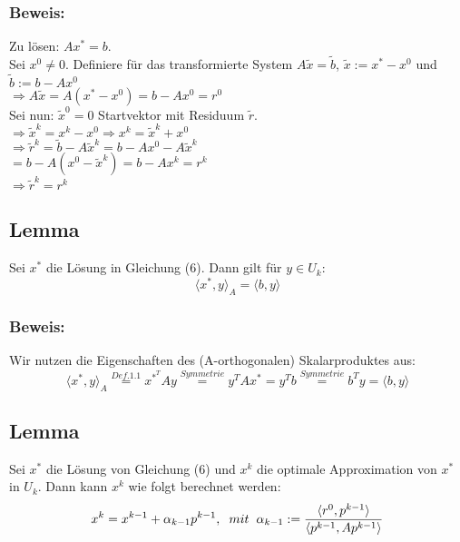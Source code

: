 \documentclass{article}
\begin{document}
\subsubsection{Beweis:}
Zu lösen: $Ax^{*} = b$.
\\Sei $x^{0} \ne 0$. Definiere für das transformierte System $A\tilde x = \tilde b$, $\tilde x := x^{*} - x^{0}$ und $\tilde b := b - Ax^{0}$
\\$\Longrightarrow A\tilde x = A(x^{*} - x^{0}) = b - Ax^{0} = r^{0}$
\\Sei nun: $\tilde x^{0} = 0$ Startvektor mit Residuum $\tilde r$.
\\$\Longrightarrow \tilde x^{k} = x^{k} - x^{0} \Longrightarrow x^{k} = \tilde x^{k} + x^{0}$
\\$\Longrightarrow \tilde r^{k} = \tilde b - A\tilde x^{k} = b - Ax^{0} - A\tilde x^{k}$
\\$= b - A(x^{0} - \tilde x^{k}) = b - Ax^{k} = r^{k}$
\\$\Longrightarrow \tilde r^{k} = r^{k}$

\subsection{Lemma}
Sei $x^{*}$ die Lösung in Gleichung (6). Dann gilt für $y \in U_{k}$:
\begin{equation}
\langle x^{*}, y \rangle _{A} = \langle b, y \rangle
\end{equation}

\subsubsection{Beweis:}
Wir nutzen die Eigenschaften des (A-orthogonalen) Skalarproduktes aus:
\begin{equation*}
\langle x^{*}, y \rangle _{A} \overset{Def. 1.1}{=} x^{{*}^{T}}Ay \overset{Symmetrie}{=} y^{T}Ax^{*} = y^{T}b \overset{Symmetrie}{=} b^{T}y = \langle b, y \rangle
\end{equation*}

\subsection{Lemma}
Sei $x^{*}$ die Lösung von Gleichung (6) und $x^{k}$ die optimale Approximation von $x^{*}$ in $U_{k}$. Dann kann $x^{k}$ wie folgt berechnet werden:
\begin{equation}
x^{k} = x^{k-1} + \alpha_{k-1}p^{k-1}, \hspace{2mm} mit \hspace{2mm} \alpha_{k-1} := \frac {\langle r^{0}, p^{k-1} \rangle} {\langle {p^{k-1}, Ap^{k-1}} \rangle}
\end{equation}
\end{document}
